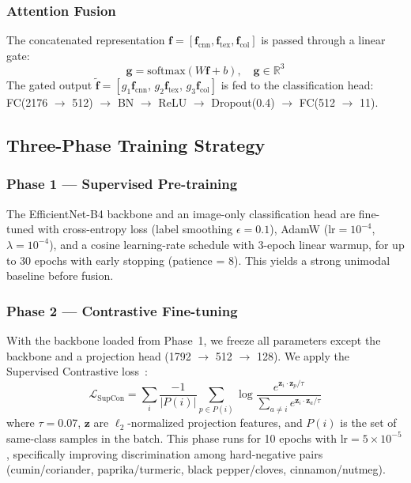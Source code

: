 \documentclass[conference]{IEEEtran}
\begin{document}
\subsubsection{Attention Fusion}
The concatenated representation
$\mathbf{f} = [\mathbf{f}_{\text{cnn}}, \mathbf{f}_{\text{tex}}, \mathbf{f}_{\text{col}}]$
is passed through a linear gate:
\begin{equation}
    \mathbf{g} = \text{softmax}(W\mathbf{f} + b), \quad \mathbf{g} \in \mathbb{R}^3
    \label{eq:gate}
\end{equation}
The gated output $\tilde{\mathbf{f}} = [g_1\mathbf{f}_{\text{cnn}},\,
g_2\mathbf{f}_{\text{tex}},\, g_3\mathbf{f}_{\text{col}}]$ is fed to the
classification head: FC(2176 $\to$ 512) $\to$ BN $\to$ ReLU $\to$ Dropout(0.4)
$\to$ FC(512 $\to$ 11).

\subsection{Three-Phase Training Strategy}

\subsubsection{Phase 1 — Supervised Pre-training}
The EfficientNet-B4 backbone and an image-only classification head are fine-tuned
with cross-entropy loss (label smoothing $\epsilon=0.1$), AdamW
($\text{lr}=10^{-4}$, $\lambda=10^{-4}$), and a cosine learning-rate schedule
with 3-epoch linear warmup, for up to 30 epochs with early stopping
(patience = 8). This yields a strong unimodal baseline before fusion.

\subsubsection{Phase 2 — Contrastive Fine-tuning}
With the backbone loaded from Phase~1, we freeze all parameters except the backbone
and a projection head (1792 $\to$ 512 $\to$ 128). We apply the Supervised
Contrastive loss~\cite{khosla2020supervised}:
\begin{equation}
    \mathcal{L}_{\text{SupCon}} = \sum_{i} \frac{-1}{|P(i)|} \sum_{p \in P(i)}
    \log \frac{e^{\mathbf{z}_i \cdot \mathbf{z}_p / \tau}}
    {\sum_{a \neq i} e^{\mathbf{z}_i \cdot \mathbf{z}_a / \tau}}
    \label{eq:supcon}
\end{equation}
where $\tau = 0.07$, $\mathbf{z}$ are $\ell_2$-normalized projection features, and
$P(i)$ is the set of same-class samples in the batch. This phase runs for
10 epochs with $\text{lr}=5 \times 10^{-5}$, specifically improving discrimination
among hard-negative pairs (cumin/coriander, paprika/turmeric, black pepper/cloves,
cinnamon/nutmeg).
\end{document}
